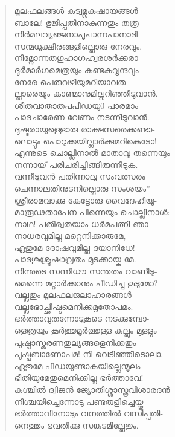 \begin{verse}
മൂലഫലങ്ങള്‍ കട്വമ്ലകഷായങ്ങള്‍\\
ബാലേ! ഭുജിപ്പതിനാകുന്നതും തത്ര\\
നിര്‍മലവ്യഞ്ജനാപൂപാന്നപാനാദി\\
സന്മധുക്ഷീരങ്ങളില്ലൊരു നേരവും.\\
നിമ്നോന്നതഗുഹാഗഹ്വരശര്‍ക്കരാ-\\
ദുര്‍മാര്‍ഗമെത്രയും കണ്ടകവൃന്ദവും\\
നേരേ പെരുവഴിയുമറിയാവത-\\
ല്ലാരെയും കാണ്മാനുമില്ലറിഞ്ഞീടുവാന്‍.\\
ശീതവാതാതപപീഡയു0 പാരമാം\\
പാദചാരേണ വേണം നടന്നീടുവാന്‍.\\
ദുഷ്ടരായുള്ളൊരു രാക്ഷസരെക്കണ്ടാ-\\
ലൊട്ടും പൊറുക്കയില്ലാര്‍ക്കുമറികെടോ!\\
എന്നുടെ ചൊല്ലിനാല്‍ മാതാവു തന്നെയും\\
നന്നായ് പരിചരിച്ചിങ്ങിരുന്നീടുക.\\
വന്നീടുവന്‍ പതിന്നാലു സംവത്സരം\\
ചെന്നാലതിനുടനില്ലൊരു സംശയം”\\
ശ്രീരാമവാക്കു കേട്ടോരു വൈദേഹിയു-\\
മാരൂഢതാപേന പിന്നെയും ചൊല്ലിനാള്‍:\\
നാഥ! പതിര്വതയാം ധര്‍മപത്നി ഞാ-\\
നാധരവുമില്ല മറ്റെനിക്കാരുമേ,\\
ഏതുമേ ദോഷവുമില്ല ദയാനിധേ!\\
പാദശുശ്രൂഷാവ്രതം മുടക്കായ്ക മേ.\\
നിന്നുടെ സന്നിധൗ സന്തതം വാണീടു-\\
മെന്നെ മറ്റാര്‍ക്കാനും പീഡിച്ചു കൂടുമോ?\\
വല്ലതും മൂലഫലജലാഹാരങ്ങള്‍\\
വല്ലഭോച്ഛിഷ്ടമെനിക്കമൃതോപമം.\\
ഭര്‍ത്താവുതന്നോടുകൂടെ നടക്കുമ്പോ-\\
ളെത്രയും കൂര്‍ത്തുമൂര്‍ത്തുള്ള കല്ലും മുള്ളും\\
പുഷ്പാസ്തരണതുല്യങ്ങളെനിക്കതും\\
പുഷ്പബാണോപമ! നീ വെടിഞ്ഞീടൊലാ.\\
ഏതുമേ പീഡയുണ്ടാകയില്ലെന്മൂലം\\
ഭീതിയുമേതുമെനിക്കില്ല ഭര്‍ത്താവേ!\\
കശ്ചില്‍ ദ്വിജന്‍ ജ്യോതിശ്ശാസ്ത്രവിശാരദന്‍\\
നിശ്ചയിച്ചെന്നോടു പണ്ടരുളിച്ചെയ്തു\\
ഭര്‍ത്താവിനോടും വനത്തില്‍ വസിപ്പതി-\\
നെത്തും ഭവതിക്കു സങ്കടമില്ലേതും.\\

\end{verse}
